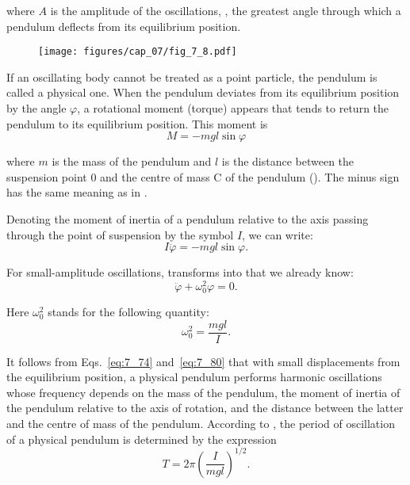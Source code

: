 \noindent
where $A$ is the amplitude of the oscillations, \ie, the greatest angle through which a pendulum deflects from its equilibrium position.

\begin{figure}[t]
	\begin{center}
		\texttt{[image: figures/cap\_07/fig\_7\_8.pdf]}
		\caption[]{}
		\label{fig:7_8}
	\end{center}
	\vspace{-0.8cm}
\end{figure}

If an oscillating body cannot be treated as a point particle, the pendulum is called a physical one. When the pendulum deviates from its equilibrium position by the angle $\varphi$, a rotational moment (torque) appears that tends to return the pendulum to its equilibrium position. This moment is
\begin{equation}\label{eq:7_78}
	M = -mgl\sin\varphi
\end{equation}

\noindent
where $m$ is the mass of the pendulum and $l$ is the distance between the suspension point $0$ and the centre of mass C of the pendulum (). The minus sign has the same meaning as in .

Denoting the moment of inertia of a pendulum relative to the axis passing through the point of suspension by the symbol $I$, we can write:
\begin{equation}\label{eq:7_79}
	I\ddot{\varphi} = -mgl\sin\varphi.
\end{equation}

\noindent
For small-amplitude oscillations,  transforms into  that we already know:
\begin{equation*}
	\ddot{\varphi} +\omega_0^2\varphi = 0.
\end{equation*}

\noindent
Here $\omega_0^2$ stands for the following quantity:
\begin{equation}\label{eq:7_80}
	\omega_0^2 = \frac{mgl}{I}.
\end{equation}

It follows from Eqs.~\eqref{eq:7_74} and~\eqref{eq:7_80} that with small displacements from the equilibrium position, a physical pendulum performs harmonic oscillations whose frequency depends on the mass of the pendulum, the moment of inertia of the pendulum relative to the axis of rotation, and the distance between the latter and the centre of mass of the pendulum. According to , the period of oscillation of a physical pendulum is determined by the expression
\begin{equation}\label{eq:7_81}
	T = 2\pi\left(\frac{I}{mgl}\right)^{1/2}.
\end{equation}


